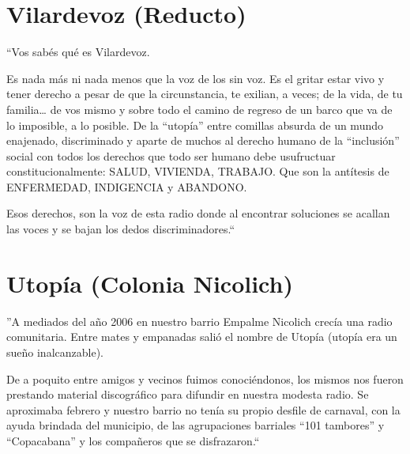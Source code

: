 \section*{Vilardevoz (Reducto)}
``Vos sabés qué es Vilardevoz.

Es nada más ni nada menos que la voz de los sin voz. Es el gritar estar vivo y tener derecho a pesar de que la circunstancia, te exilian, a veces; de la vida, de tu familia… de vos mismo y sobre todo el camino de regreso de un barco que va de lo imposible, a lo posible. De la ``utopía'' entre comillas absurda de un mundo enajenado, discriminado y aparte de muchos al derecho humano de la ``inclusión'' social con todos los derechos que todo ser humano debe usufructuar constitucionalmente: SALUD, VIVIENDA, TRABAJO. Que son la antítesis de ENFERMEDAD, INDIGENCIA y ABANDONO.

Esos derechos, son la voz de esta radio donde al encontrar soluciones se acallan las voces y se bajan los dedos discriminadores.``

\section*{Utopía (Colonia Nicolich)}

''A mediados del año 2006 en nuestro barrio Empalme Nicolich crecía una radio comunitaria. Entre mates y empanadas salió el nombre de Utopía (utopía era un sueño inalcanzable).

De a poquito entre amigos y vecinos fuimos conociéndonos, los mismos nos fueron prestando material discográfico para difundir en nuestra modesta radio.
Se aproximaba febrero y nuestro barrio no tenía su propio desfile de carnaval, con la ayuda brindada del municipio, de las agrupaciones barriales ``101 tambores'' y ``Copacabana'' y los compañeros que se disfrazaron.``
